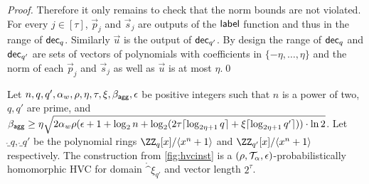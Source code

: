 \begin{proof}
Therefore it only remains to check that the norm bounds are not violated. For every $j\in[\tau]$, $\vec{p}_j$ and $\vec{s}_j$ are outputs of the $\mathsf{label}$ function and thus in the range of $\mathsf{dec}_q$.
Similarly $\vec{u}$ is the output of $\mathsf{dec}_{q'}$.
By design the range of $\mathsf{dec}_q$ and $\mathsf{dec}_{q'}$ are sets of vectors of polynomials with coefficients in $\{-\eta,\dots,\eta\}$ and the norm of each $\vec{p}_j$ and $\vec{s}_j$ as well as $\vec{u}$ is at most $\eta$.\qed
\end{proof}

\begin{lemma}\label{lem:hvcprobhom}
  Let $n,q,q',\alpha_w,\rho,\eta,\tau,\xi,\beta_{\mathsf{agg}},\epsilon$ be positive integers such that $n$ is a power of two, $q,q'$ are prime, and $\beta_{\mathsf{agg}} \geq \eta\sqrt{2\alpha_w\rho(\epsilon+1+\log_2 n + \log_2(2\tau \lceil\log_{2\eta+1}q\rceil + \xi\lceil\log_{2\eta+1}q'\rceil))\cdot\ln2}$.
  Let $\ring_q,\ring_{q'}$ be the polynomial rings $\ZZ_q[x]/\langle x^n+1\rangle$ and $\ZZ_{q'}[x]/\langle x^n+1\rangle$ respectively.
  The construction from \autoref{fig:hvcinst} is a $(\rho,\mathcal{T}_\alpha,\epsilon)$-probabilistically homomorphic HVC for domain $\ring^\xi_{q'}$ and vector length $2^\tau$.
\end{lemma}
